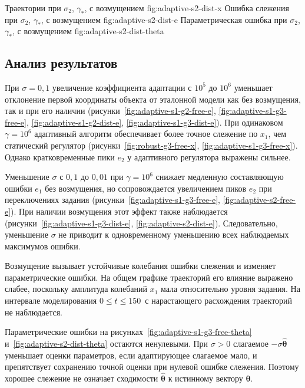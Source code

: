   {Траектории при $\sigma_2$, $\gamma_*$, с возмущением}
  {fig:adaptive-s2-dist-x}
  {Ошибка слежения при $\sigma_2$, $\gamma_*$, с возмущением}
  {fig:adaptive-s2-dist-e}
  {Параметрическая ошибка при $\sigma_2$, $\gamma_*$, с возмущением}
  {fig:adaptive-s2-dist-theta}

\subsection{Анализ результатов}

При $\sigma=0{,}1$ увеличение коэффициента адаптации с $10^5$ до $10^6$
уменьшает отклонение первой координаты объекта от эталонной модели
как без возмущения, так и при его наличии
(рисунки~\ref{fig:adaptive-s1-g2-free-e}, \ref{fig:adaptive-s1-g3-free-e},
\ref{fig:adaptive-s1-g2-dist-e}, \ref{fig:adaptive-s1-g3-dist-e}).
При одинаковом $\gamma=10^6$ адаптивный алгоритм обеспечивает более
точное слежение по $x_1$, чем статический регулятор
(рисунки~\ref{fig:robust-g3-free-x}, \ref{fig:adaptive-s1-g3-free-x}).
Однако кратковременные пики $e_2$ у адаптивного регулятора выражены сильнее.

Уменьшение $\sigma$ с $0{,}1$ до $0{,}01$ при $\gamma=10^6$ снижает
медленную составляющую ошибки $e_1$ без возмущения, но сопровождается
увеличением пиков $e_2$ при переключениях задания
(рисунки~\ref{fig:adaptive-s1-g3-free-e}, \ref{fig:adaptive-s2-free-e}).
При наличии возмущения этот эффект также наблюдается
(рисунки~\ref{fig:adaptive-s1-g3-dist-e}, \ref{fig:adaptive-s2-dist-e}).
Следовательно, уменьшение $\sigma$ не приводит к одновременному
уменьшению всех наблюдаемых максимумов ошибки.

Возмущение вызывает устойчивые колебания ошибки слежения и изменяет
параметрические ошибки. На общем графике траекторий его влияние
выражено слабее, поскольку амплитуда колебаний $x_1$ мала относительно
уровня задания. На интервале моделирования $0\le t\le150$~с
нарастающего расхождения траекторий не наблюдается.

Параметрические ошибки на рисунках~\ref{fig:adaptive-s1-g3-free-theta}
и~\ref{fig:adaptive-s2-dist-theta} остаются ненулевыми.
При $\sigma>0$ слагаемое $-\sigma\hat{\bm\theta}$ уменьшает оценки
параметров, если адаптирующее слагаемое мало, и препятствует сохранению
точной оценки при нулевой ошибке слежения. Поэтому хорошее слежение
не означает сходимости $\hat{\bm\theta}$ к истинному вектору $\bm\theta$.

